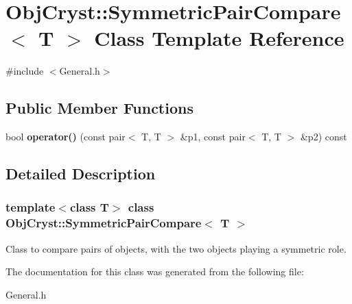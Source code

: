 \hypertarget{class_obj_cryst_1_1_symmetric_pair_compare}{}\section{Obj\+Cryst\+::Symmetric\+Pair\+Compare$<$ T $>$ Class Template Reference}
\label{class_obj_cryst_1_1_symmetric_pair_compare}


{\ttfamily \#include $<$General.\+h$>$}

\subsection*{Public Member Functions}
\begin{DoxyCompactItemize}
\item 
\mbox{\label{class_obj_cryst_1_1_symmetric_pair_compare_a480f994818a8bec40c0bb1b70621c8e2}} 
bool {\bfseries operator()} (const pair$<$ T, T $>$ \&p1, const pair$<$ T, T $>$ \&p2) const
\end{DoxyCompactItemize}


\subsection{Detailed Description}
\subsubsection*{template$<$class T$>$\newline
class Obj\+Cryst\+::\+Symmetric\+Pair\+Compare$<$ T $>$}

Class to compare pairs of objects, with the two objects playing a symmetric role. 

The documentation for this class was generated from the following file\+:\begin{DoxyCompactItemize}
\item 
General.\+h\end{DoxyCompactItemize}
